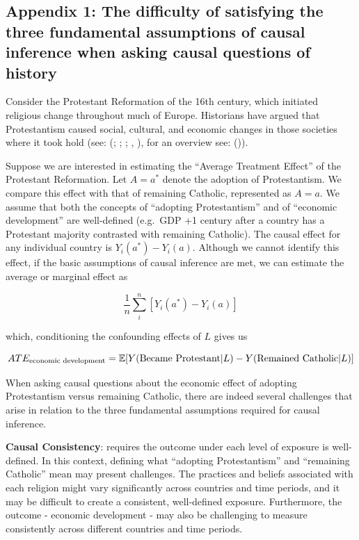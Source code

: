 \documentclass[
  singlecolumn,
  9pt]{article}
\begin{document}
\newpage{}

\subsection{Appendix 1: The difficulty of satisfying the three
fundamental assumptions of causal inference when asking causal questions
of
history}\label{appendix-1-the-difficulty-of-satisfying-the-three-fundamental-assumptions-of-causal-inference-when-asking-causal-questions-of-history}

Consider the Protestant Reformation of the 16th century, which initiated
religious change throughout much of Europe. Historians have argued that
Protestantism caused social, cultural, and economic changes in those
societies where it took hold (see: (; ;
; , ), for an overview see:
()).

Suppose we are interested in estimating the ``Average Treatment Effect''
of the Protestant Reformation. Let \(A = a^*\) denote the adoption of
Protestantism. We compare this effect with that of remaining Catholic,
represented as \(A = a\). We assume that both the concepts of ``adopting
Protestantism'' and of ``economic development'' are well-defined
(e.g.~GDP +1 century after a country has a Protestant majority
contrasted with remaining Catholic). The causal effect for any
individual country is \(Y_i(a^*) - Y_i(a)\). Although we cannot identify
this effect, if the basic assumptions of causal inference are met, we
can estimate the average or marginal effect as

\[
\frac{1}{n} \sum_i^{n} \left[ Y_i(a^*) - Y_i(a) \right]
\]

which, conditioning the confounding effects of \(L\) gives us

\[ATE_{\textnormal{economic~development}} = \mathbb{E}[Y(\textnormal{Became~Protestant}|L) - Y(\textnormal{Remained~Catholic}|L)]\]

When asking causal questions about the economic effect of adopting
Protestantism versus remaining Catholic, there are indeed several
challenges that arise in relation to the three fundamental assumptions
required for causal inference.

\textbf{Causal Consistency}: requires the outcome under each level of
exposure is well-defined. In this context, defining what ``adopting
Protestantism'' and ``remaining Catholic'' mean may present challenges.
The practices and beliefs associated with each religion might vary
significantly across countries and time periods, and it may be difficult
to create a consistent, well-defined exposure. Furthermore, the outcome
- economic development - may also be challenging to measure consistently
across different countries and time periods.
\end{document}
